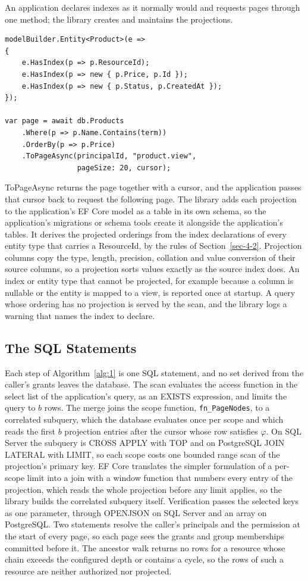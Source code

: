 \documentclass[conference]{IEEEtran}
\begin{document}
An application declares indexes as it normally would and requests pages through one method; the library creates and maintains the projections.

\begin{lstlisting}[style=pseudo]
modelBuilder.Entity<Product>(e =>
{
    e.HasIndex(p => p.ResourceId);
    e.HasIndex(p => new { p.Price, p.Id });
    e.HasIndex(p => new { p.Status, p.CreatedAt });
});

var page = await db.Products
    .Where(p => p.Name.Contains(term))
    .OrderBy(p => p.Price)
    .ToPageAsync(principalId, "product.view",
                 pageSize: 20, cursor);
\end{lstlisting}

ToPageAsync returns the page together with a cursor, and the application passes that cursor back to request the following page. The library adds each projection to the application's EF Core model as a table in its own schema, so the application's migrations or schema tools create it alongside the application's tables. It derives the projected orderings from the index declarations of every entity type that carries a ResourceId, by the rules of Section~\ref{sec-4-2}. Projection columns copy the type, length, precision, collation and value conversion of their source columns, so a projection sorts values exactly as the source index does. An index or entity type that cannot be projected, for example because a column is nullable or the entity is mapped to a view, is reported once at startup. A query whose ordering has no projection is served by the scan, and the library logs a warning that names the index to declare.

\subsection{The SQL Statements}\label{sec-6-2}

Each step of Algorithm~\ref{alg:1} is one SQL statement, and no set derived from the caller's grants leaves the database. The scan evaluates the access function in the select list of the application's query, as an EXISTS expression, and limits the query to \(b\) rows. The merge joins the scope function, \texttt{fn\_PageNodes}, to a correlated subquery, which the database evaluates once per scope and which reads the first \(b\) projection entries after the cursor whose row satisfies \(\varphi\). On SQL Server the subquery is CROSS APPLY with TOP and on PostgreSQL JOIN LATERAL with LIMIT, so each scope costs one bounded range scan of the projection's primary key. EF Core translates the simpler formulation of a per-scope limit into a join with a window function that numbers every entry of the projection, which reads the whole projection before any limit applies, so the library builds the correlated subquery itself. Verification passes the selected keys as one parameter, through OPENJSON on SQL Server and an array on PostgreSQL. Two statements resolve the caller's principals and the permission at the start of every page, so each page sees the grants and group memberships committed before it. The ancestor walk returns no rows for a resource whose chain exceeds the configured depth or contains a cycle, so the rows of such a resource are neither authorized nor projected.
\end{document}
